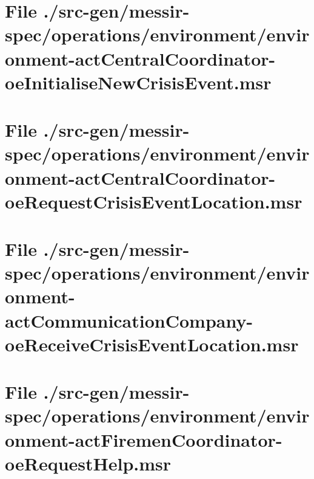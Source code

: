 \section[File /.../environment-actCentralCoordinator-oeInitialiseNewCrisisEvent.msr]{File ./src-gen/messir-spec/operations/environment/environment-actCentralCoordinator-oeInitialiseNewCrisisEvent.msr}
\scriptsize

\normalsize
	
\section[File /.../environment-actCentralCoordinator-oeRequestCrisisEventLocation.msr]{File ./src-gen/messir-spec/operations/environment/environment-actCentralCoordinator-oeRequestCrisisEventLocation.msr}
\scriptsize

\normalsize
	
\section[File /.../environment-actCommunicationCompany-oeReceiveCrisisEventLocation.msr]{File ./src-gen/messir-spec/operations/environment/environment-actCommunicationCompany-oeReceiveCrisisEventLocation.msr}
\scriptsize

\normalsize
	
\section[File /src-gen.../environment-actFiremenCoordinator-oeRequestHelp.msr]{File ./src-gen/messir-spec/operations/environment/environment-actFiremenCoordinator-oeRequestHelp.msr}
\scriptsize

\normalsize
	

